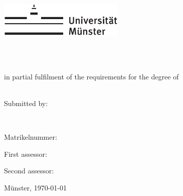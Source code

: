 \begin{centering}
\vspace*{\fill}
\includegraphics[width=6cm]{./img/Logo_UniMuenster_2023_100K.pdf}

\vspace{2cm} 

{\LARGE
	\textbf{\printtitle}\\[2cm]
}

{\large
	\large
    \textsc{\printtype} \\
    	\normalsize
	in partial fulfilment of the requirements for the degree of\\
	\large
    \textsc{\printdegree} \\[2cm]
}

{\large
	Submitted by:
}

{ \Large
	\textbf{\printname}\\[1cm]
}

{\large
	Matrikelnummer: \printnumber\\[1cm]
}

\end{centering}

\par
\normalsize
\vspace*{1ex}
First assessor:\\
\large
\textit{\printfirstassessor}

\par
\normalsize
\vspace*{0.5ex}
Second assessor:\\
\large
\textit{\printsecondassessor}

{\large
Münster, \today
}
\vfill

